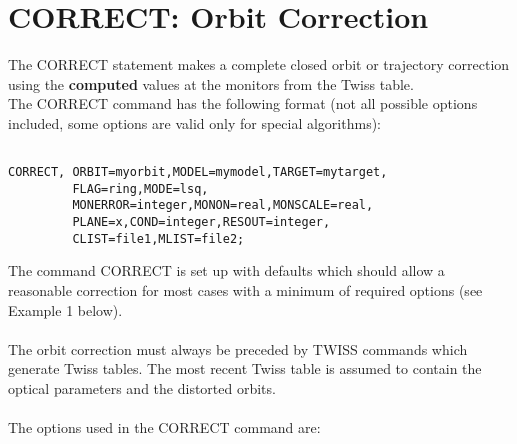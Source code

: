 










\section{CORRECT: Orbit Correction}  The CORRECT statement makes a complete closed orbit  or trajectory correction using the \textbf{computed} values at the monitors  from the Twiss table.  
\\ The CORRECT command has the following format (not all possible options included, some options are valid only for special algorithms): 
\begin{verbatim}

CORRECT, ORBIT=myorbit,MODEL=mymodel,TARGET=mytarget,
         FLAG=ring,MODE=lsq,  
         MONERROR=integer,MONON=real,MONSCALE=real,
         PLANE=x,COND=integer,RESOUT=integer,
         CLIST=file1,MLIST=file2; 
\end{verbatim} The command CORRECT is set up with defaults which should allow a reasonable correction for most cases with a minimum of required options (see Example 1 below). 
\\
\\ The orbit correction must always be preceded by TWISS commands  which generate Twiss tables. The most recent Twiss table is assumed to contain the optical parameters and the distorted orbits. 
\\
\\ The options used in the CORRECT command are: 
\\
